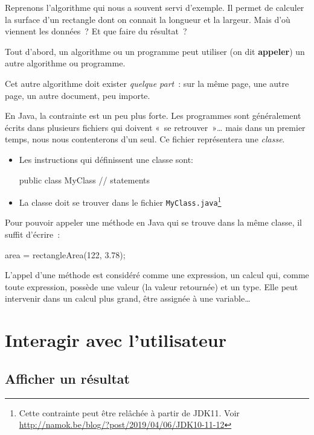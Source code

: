 		Reprenons l’algorithme  qui nous a souvent servi
		d’exemple.  Il permet de calculer la surface d’un rectangle dont on
		connait la longueur et la largeur.  Mais d’où viennent les données~?  Et
		que faire du résultat~?
		
		Tout d’abord, un algorithme ou un programme peut utiliser 
		(on dit \textbf{appeler}) un autre algorithme ou programme.
	
		Cet autre algorithme doit exister \emph{quelque part}~: sur la même
		page, une autre page, un autre document, peu importe.
		
		En Java, la contrainte est un peu plus forte.  Les programmes sont
		généralement écrits dans plusieurs fichiers qui doivent «~se
		retrouver~»… mais dans un premier temps, nous nous contenterons d'un
		seul.  Ce fichier représentera une \emph{classe}. 

		\begin{itemize}
			\item Les instructions qui définissent une classe sont:
				\begin{java}
public class MyClass{
	// statements
}
				\end{java}
			\item La classe  doit se trouver dans le fichier 
				\texttt{MyClass.java}\footnote{Cette contrainte peut être 
					relâchée à partir de JDK11. Voir 
					\url{http://namok.be/blog/?post/2019/04/06/JDK10-11-12}}
		\end{itemize}

		Pour pouvoir appeler une méthode en Java qui se trouve dans la même 
		classe, il suffit d'écrire~:
		
		\begin{java}
area = rectangleArea(122, 3.78);			
		\end{java}
		
		L’appel d’une méthode est considéré comme une expression, un calcul qui,
		comme toute expression, possède une valeur (la valeur retournée) et un
		type. Elle peut intervenir dans un calcul plus grand, être assignée
		à une variable\dots
	
	\section{Interagir avec l'utilisateur}
		\subsection{Afficher un résultat}
		
